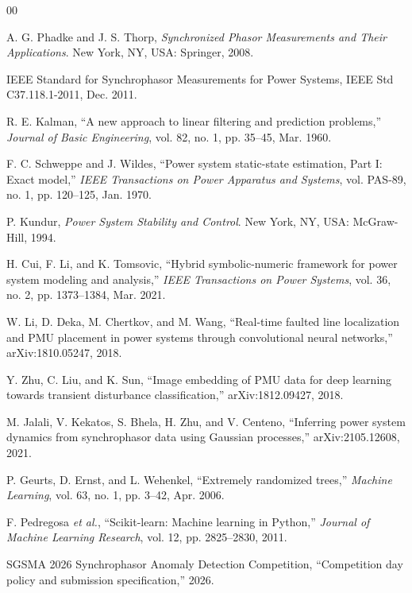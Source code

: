 \documentclass[conference]{IEEEtran}
\begin{document}
\begin{thebibliography}{00}

A. G. Phadke and J. S. Thorp, \emph{Synchronized Phasor Measurements and Their Applications}. New York, NY, USA: Springer, 2008.

IEEE Standard for Synchrophasor Measurements for Power Systems, IEEE Std C37.118.1-2011, Dec. 2011.

R. E. Kalman, ``A new approach to linear filtering and prediction problems,'' \emph{Journal of Basic Engineering}, vol. 82, no. 1, pp. 35--45, Mar. 1960.

F. C. Schweppe and J. Wildes, ``Power system static-state estimation, Part I: Exact model,'' \emph{IEEE Transactions on Power Apparatus and Systems}, vol. PAS-89, no. 1, pp. 120--125, Jan. 1970.

P. Kundur, \emph{Power System Stability and Control}. New York, NY, USA: McGraw-Hill, 1994.

H. Cui, F. Li, and K. Tomsovic, ``Hybrid symbolic-numeric framework for power system modeling and analysis,'' \emph{IEEE Transactions on Power Systems}, vol. 36, no. 2, pp. 1373--1384, Mar. 2021.

W. Li, D. Deka, M. Chertkov, and M. Wang, ``Real-time faulted line localization and PMU placement in power systems through convolutional neural networks,'' arXiv:1810.05247, 2018.

Y. Zhu, C. Liu, and K. Sun, ``Image embedding of PMU data for deep learning towards transient disturbance classification,'' arXiv:1812.09427, 2018.

M. Jalali, V. Kekatos, S. Bhela, H. Zhu, and V. Centeno, ``Inferring power system dynamics from synchrophasor data using Gaussian processes,'' arXiv:2105.12608, 2021.

P. Geurts, D. Ernst, and L. Wehenkel, ``Extremely randomized trees,'' \emph{Machine Learning}, vol. 63, no. 1, pp. 3--42, Apr. 2006.

F. Pedregosa \emph{et al.}, ``Scikit-learn: Machine learning in Python,'' \emph{Journal of Machine Learning Research}, vol. 12, pp. 2825--2830, 2011.

SGSMA 2026 Synchrophasor Anomaly Detection Competition, ``Competition day policy and submission specification,'' 2026.

\end{thebibliography}
\end{document}
